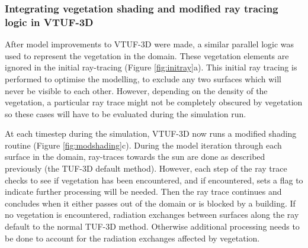 \documentclass[final,3p,times,authoryear]{elsarticle}
\begin{document}

\subsubsection{Integrating vegetation shading and modified ray tracing logic in VTUF-3D}\label{sec:Representationofvegetation}

After model improvements to VTUF-3D were made, a similar parallel logic was used to represent the vegetation in the domain. These vegetation elements are ignored in the initial ray-tracing (Figure \ref{fig:initray}a). This initial ray tracing is performed to optimise the modelling, to exclude any two surfaces which will never be visible to each other. However, depending on the density of the vegetation, a particular ray trace might not be completely obscured by vegetation so these cases will have to be evaluated during the simulation run.

At each timestep during the simulation, VTUF-3D now runs a modified shading routine (Figure \ref{fig:modshading}c). During the model iteration through each surface in the domain, ray-traces towards the sun are done as described previously (the TUF-3D default method). However, each step of the ray trace checks to see if vegetation has been encountered, and if encountered, sets a flag to indicate further processing will be needed. Then the ray trace continues and concludes when it either passes out of the domain or is blocked by a building. If no vegetation is encountered, radiation exchanges between surfaces along the ray default to the normal TUF-3D method. Otherwise additional processing needs to be done to account for the radiation exchanges affected by vegetation.
\end{document}
